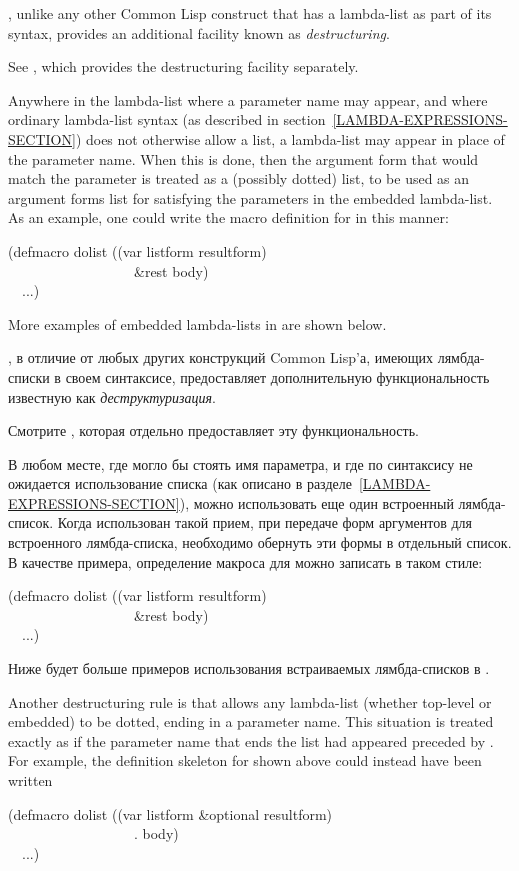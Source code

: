 \begin{defmac}
, unlike any other Common Lisp construct that has a lambda-list
as part of its syntax, provides an additional facility known as
\emph{destructuring}.
\begin{newer}
See , which provides the destructuring facility separately.
\end{newer}
Anywhere in the lambda-list where a parameter
name may appear, and where ordinary lambda-list syntax (as described
in section~\ref{LAMBDA-EXPRESSIONS-SECTION}) does not
otherwise allow a list, a lambda-list may appear in place
of the parameter name.  When this is done, then the argument form
that would match the parameter is treated as a (possibly dotted) list,
to be used as an argument forms list for satisfying the
parameters in the embedded lambda-list.
As an example, one could write the macro definition
for  in this manner:
\begin{lisp}
(defmacro dolist ((var listform  resultform) \\
~~~~~~~~~~~~~~~~~~\&rest body) \\
~~...)
\end{lisp}
More examples of embedded lambda-lists in  are shown below.

, в отличие от любых других конструкций Common Lisp'а, имеющих
лямбда-списки в своем синтаксисе, предоставляет дополнительную функциональность
известную как \emph{деструктуризация}.
\begin{newer}
Смотрите , которая отдельно предоставляет эту функциональность.
\end{newer}
В любом месте, где могло бы стоять имя параметра, и где по синтаксису не
ожидается использование списка (как описано в
разделе~\ref{LAMBDA-EXPRESSIONS-SECTION}), можно использовать еще один
встроенный лямбда-список. Когда использован такой прием, при передаче форм
аргументов для встроенного лямбда-списка, необходимо обернуть эти формы в
отдельный список.
В качестве примера, определение макроса для  можно записать в таком
стиле:
\begin{lisp}
(defmacro dolist ((var listform  resultform) \\
~~~~~~~~~~~~~~~~~~\&rest body) \\
~~...)
\end{lisp}
Ниже будет больше примеров использования встраиваемых лямбда-списков в
.

Another destructuring rule is that  allows any lambda-list
(whether top-level or embedded) to be dotted, ending
in a parameter name.  This situation is treated exactly as if the
parameter name that ends the list had appeared preceded by .
For example, the definition skeleton for  shown above could
instead have been written
\begin{lisp}
(defmacro dolist ((var listform \&optional resultform) \\
~~~~~~~~~~~~~~~~~~. body) \\
~~...)
\end{lisp}


\end{defmac}
